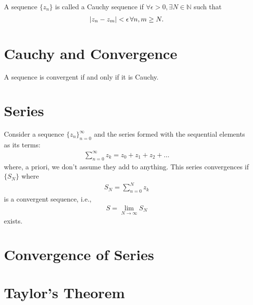 \documentclass{article}
\theoremstyle{definition}
\begin{document}
A sequence $\{ z_n \}$ is called a Cauchy sequence if $\forall \epsilon > 0, \exists N \in \mathbb{N}$ such that 
\begin{align}
\abs{z_n - z_{m}} < \epsilon \,\forall n,m \geq N.
\end{align}


\section{Cauchy and Convergence}

A sequence is convergent if and only if it is Cauchy.


\section{Series}

Consider a sequence $\{z_n\}^\infty_{n=0}$ and the series formed with the sequential elements as its terms:
\begin{align}
\sum^\infty_{n=0} z_k = z_0 + z_1 + z_2 + \dots
\end{align}
where, a priori, we don't assume they add to anything. This series convergences if $\{ S_N\}$ where
\begin{align}
S_N = \sum^N_{n=0} z_k
\end{align}
is a convergent sequence, i.e.,
\begin{align}
S = \lim_{N\to \infty} S_N
\end{align}
exists. 





\section{Convergence of Series}

\section{Taylor's Theorem}
\end{document}
